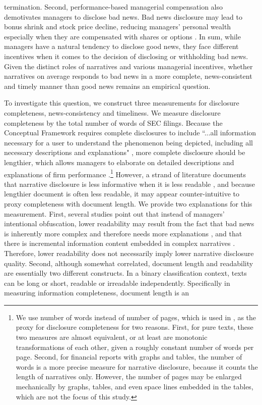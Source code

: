 \documentclass[a4paper]{article}
\begin{document}
\begin{spacing}{2}
termination. Second, performance-based managerial compensation also demotivates managers to disclose bad news. Bad news disclosure may lead to bonus shrink and stock price decline, reducing managers' personal wealth especially when they are compensated with shares or options \cite{kothariManagersWithholdBad2009}. In sum, while managers have a natural tendency to disclose good news, they face different incentives when it comes to the decision of disclosing or withholding bad news. Given the distinct roles of narratives and various managerial incentives, whether narratives on average responds to bad news in a more complete, news-consistent and timely manner than good news remains an empirical question. 

To investigate this question, we construct three measurements for disclosure completeness, news-consistency and timeliness. We measure disclosure completeness by the total number of words of SEC filings. Because the Conceptual Framework requires complete disclosures to include ``...all information necessary for a user to understand the phenomenon being depicted, including all necessary descriptions and explanations" , more complete disclosure should be lengthier, which allows managers to elaborate on detailed descriptions and explanations of firm performance \cite{leuzDisclosureCostCapital2009}.\footnote{We use number of words instead of number of pages, which is used in , as the proxy for disclosure completeness for two reasons. First, for pure texts, these two measures are almost equivalent, or at least are monotonic transformations of each other, given a roughly constant number of words per page. Second, for financial reports with graphs and tables, the number of words is a more precise measure for narrative disclosure, because it counts the length of narratives only. However, the number of pages may be enlarged mechanically by graphs, tables, and even space lines embedded in the tables, which are not the focus of this study.} However, a strand of literature documents that narrative disclosure is less informative when it is less readable , and because lengthier document is often less readable, it may appear counter-intuitive to proxy completeness with document length. We provide two explanations for this measurement. First, several studies point out that instead of managers' intentional obfuscation, lower readability may result from the fact that bad news is inherently more complex and therefore needs more explanations , and that there is incremental information content embedded in complex narratives . Therefore, lower readability does not necessarily imply lower narrative disclosure quality. Second, although somewhat correlated, document length and readability are essentially two different constructs. In a binary classification context, texts can be long or short, readable or irreadable independently. Specifically in measuring information completeness, document length is an 
\end{spacing}
\end{document}
